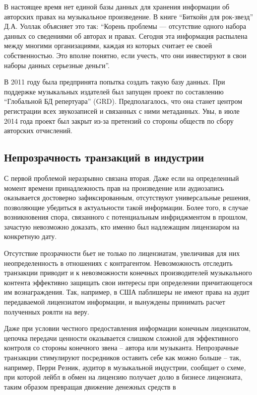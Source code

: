 \documentclass[12pt]{report}
\begin{document}
\begin{multicols}{2}
В настоящее время нет единой базы данных для хранения информации об авторских правах на музыкальное произведение. В книге “Биткойн для рок-звезд” Д.А. Уоллак объясняет это так: “Корень проблемы — отсутствие одного набора данных со сведениями об авторах и правах. Сегодня эта информация распылена между многими организациями, каждая из которых считает ее своей собственностью. Это вполне понятно, если учесть, что они инвестируют в свои наборы данных серьезные деньги”.

В 2011 году была предпринята попытка создать такую базу данных. При поддержке музыкальных издателей был запущен проект по составлению “Глобальной БД репертуара” (GRD). Предполагалось, что она станет центром регистрации всех звукозаписей и связанных с ними метаданных. Увы, в июле 2014 года проект был закрыт из-за претензий со стороны обществ по сбору авторских отчислений. 

\subsection{Непрозрачность транзакций в индустрии}

С первой проблемой неразрывно связана вторая. Даже если на определенный момент времени принадлежность прав на произведение или аудиозапись оказывается достоверно зафиксированным, отсутствуют универсальные решения, позволяющие убедиться в актуальности такой информации. Более того, в случае возникновения спора, связанного с потенциальным инфриджментом в прошлом, зачастую невозможно доказать, кто именно был надлежащим лицензиаром на конкретную дату.

Отсутствие прозрачности бьет не только по лицензиатам, увеличивая для них неопределенность в отношениях с контрагентом. Невозможность отследить транзакции приводит и к невозможности конечных производителей музыкального контента эффективно защищать свои интересы при определении причитающегося им вознаграждения. Так, например, в США паблишеры не имеют права на аудит передаваемой лицензиатом информации, и вынуждены принимать расчет полученных роялти на веру. 

Даже при условии честного предоставления информации конечным лицензиатом, цепочка передачи ценности оказывается слишком сложной для эффективного контроля со стороны конечного звена – автора или музыканта. Непрозрачные транзакции стимулируют посредников оставить себе как можно больше – так, например, Перри Резник, аудитор в музыкальной индустрии, сообщает о схеме, при которой лейбл в обмен на лицензию получает долю в бизнесе лицензиата, таким образом превращая движение денежных средств в  


\end{multicols}
\end{document}

